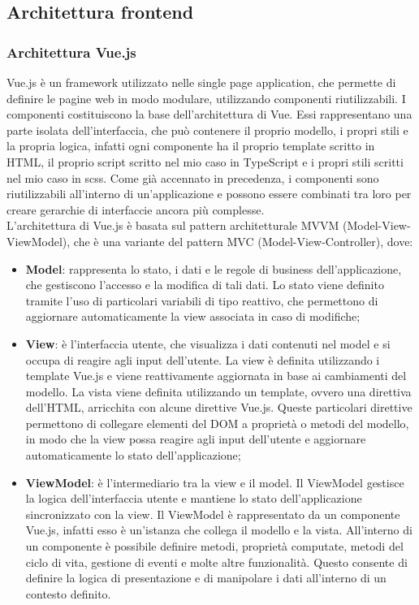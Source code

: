 \subsection{Architettura frontend}\label{subsec:architettura-front-end}
\subsubsection{Architettura Vue.js}\label{subsubsec:architettura-vue.js}
Vue.js è un framework utilizzato nelle single page application, che permette di definire le pagine web in modo modulare, utilizzando componenti riutilizzabili.
I componenti costituiscono la base dell'architettura di Vue. Essi rappresentano una parte isolata dell'interfaccia, che può contenere il proprio modello, i propri stili e la propria logica, infatti ogni componente ha il proprio
template scritto in HTML, il proprio script scritto nel mio caso in TypeScript e i propri stili scritti nel mio caso in scss.
Come già accennato in precedenza, i componenti sono riutilizzabili all'interno di un'applicazione e possono essere combinati tra loro per creare gerarchie di interfaccie ancora più complesse.\\

L'architettura di Vue.js è basata sul pattern architetturale MVVM (Model-View-ViewModel), che è una variante del pattern MVC (Model-View-Controller), dove:
\begin{itemize}
  \item \textbf{Model}: rappresenta lo stato, i dati e le regole di business dell'applicazione, che gestiscono l'accesso e la modifica di tali dati. Lo stato viene definito tramite l'uso
  di particolari variabili di tipo reattivo, che permettono di aggiornare automaticamente la view associata in caso di modifiche;
  \item \textbf{View}: è l'interfaccia utente, che visualizza i dati contenuti nel model e si occupa di reagire agli input dell'utente. La view è definita utilizzando i template Vue.js e viene reattivamente aggiornata in base ai cambiamenti del modello. La vista viene definita utilizzando un template, ovvero una direttiva dell'HTML, arricchita con alcune direttive Vue.js. 
  Queste particolari direttive permettono di collegare elementi del DOM a proprietà o metodi del modello, in modo che la view possa reagire agli input dell'utente e aggiornare automaticamente lo stato dell'applicazione;
  \item \textbf{ViewModel}: è l'intermediario tra la view e  il model. Il ViewModel gestisce la logica dell'interfaccia utente e mantiene lo stato dell'applicazione sincronizzato con la view.
  Il ViewModel è rappresentato da un componente Vue.js, infatti esso è un'istanza che collega il modello e la vista. All'interno di un componente è possibile definire metodi, proprietà 
  computate, metodi del ciclo di vita, gestione di eventi e molte altre funzionalità. Questo consente di definire la logica di presentazione e di manipolare i dati all'interno di un contesto definito.
\end{itemize}

